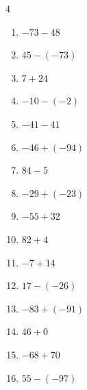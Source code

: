 \begin{multicols}{4}
\begin{enumerate}
  \item $-73-48$

        \phantom{$=-121$}

  \item $45-(-73)$

        \phantom{$=118$}

  \item $7+24$

        \phantom{$=31$}

  \item $-10-(-2)$

        \phantom{$=-8$}

  \item $-41-41$

        \phantom{$=-82$}

  \item $-46+(-94)$

        \phantom{$=-140$}

  \item $84-5$

        \phantom{$=79$}

  \item $-29+(-23)$

        \phantom{$=-52$}

  \item $-55+32$

        \phantom{$=-23$}

  \item $82+4$

        \phantom{$=86$}

  \item $-7+14$

        \phantom{$=7$}

  \item $17-(-26)$

        \phantom{$=43$}

  \item $-83+(-91)$

        \phantom{$=-174$}

  \item $46+0$

        \phantom{$=46$}

  \item $-68+70$

        \phantom{$=2$}

\columnbreak %

  \item $55-(-97)$


\end{enumerate}
\end{multicols}
